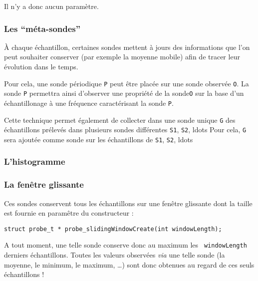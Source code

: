    Il n'y a donc aucun paramètre.

%
\subsubsection{Les ``méta-sondes''}

   À chaque échantillon, certaines sondes mettent à jours des
informations que l'on peut souhaiter conserver (par exemple la moyenne
mobile) afin de tracer leur évolution dans le temps.

   Pour cela, une sonde périodique \lstinline!P! peut être placée sur
une sonde observée \lstinline!O!. La sonde \lstinline!P! permettra
ainsi d'observer une propriété de la sonde\lstinline!O! sur la base
d'un échantillonage à une fréquence caractérisant la sonde
\lstinline!P!. 

   Cette technique permet également de collecter dans une sonde unique
\lstinline!G! des échantillons prélevés dans plusieurs sondes
différentes \lstinline!S1!, \lstinline!S2!, ldots Pour cela,
\lstinline!G! sera ajoutée comme sonde sur les échantillons de
\lstinline!S1!, \lstinline!S2!, ldots 

%
\subsubsection{L'histogramme}

%
\subsubsection{La fenêtre glissante}

   Ces sondes conservent tous les échantillons sur une fenêtre
glissante dont la taille est fournie en paramêtre du constructeur :

\begin{verbatim}
struct probe_t * probe_slidingWindowCreate(int windowLength);
\end{verbatim}

   A tout moment, une telle sonde conserve donc au maximum les {\tt
windowLength} derniers échantillons. Toutes les valeurs observées
{\em via} une telle sonde (la moyenne, le minimum, le maximum, \ldots)
sont donc obtenues au regard de ces seuls échantillons !

